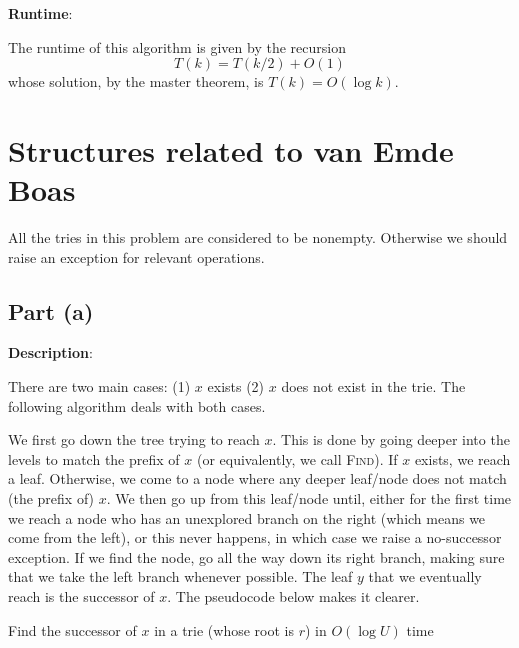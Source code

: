 \documentclass{article}
\begin{document}
\noindent\textbf{Runtime}:

The runtime of this algorithm is given by the recursion
\begin{equation*}
T(k)=T(k/2)+O(1)
\end{equation*}
whose solution, by the master theorem, is $T(k)=O(\log k)$.

\section{Structures related to van Emde Boas}
All the tries in this problem are considered to be nonempty. Otherwise we should raise an exception for relevant operations.

\subsection{Part (a)}
\noindent\textbf{Description}:

There are two main cases: (1) $x$ exists (2) $x$ does not exist in the trie. The following algorithm deals with both cases.

We first go down the tree trying to reach $x$. This is done by going deeper into the levels to match the prefix of $x$ (or equivalently, we call \textsc{Find}). If $x$ exists, we reach a leaf. Otherwise, we come to a node where any deeper leaf/node does not match (the prefix of) $x$. We then go up from this leaf/node until, either for the first time we reach a node who has an unexplored branch on the right (which means we come from the left), or this never happens, in which case we raise a no-successor exception. If we find the node, go all the way down its right branch, making sure that we take the left branch whenever possible. The leaf $y$ that we eventually reach is the successor of $x$. The pseudocode below makes it clearer.
\begin{algorithm}
\caption{Find the successor of $x$ in a trie (whose root is $r$) in $O(\log U)$ time}
\begin{algorithmic}[1]
\State{}
\Else{}
\EndIf
\EndProcedure
\end{algorithmic}
\end{algorithm}
\end{document}
